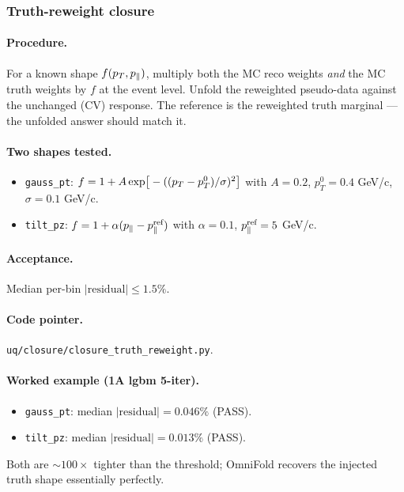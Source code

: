 \subsubsection{Truth-reweight closure}
\label{sec:closure-tr}

\paragraph{Procedure.}
For a known shape $f(p_{T},p_{\parallel})$, multiply both the MC reco weights
\emph{and} the MC truth weights by $f$ at the event level. Unfold the
reweighted pseudo-data against the unchanged (CV) response. The
reference is the reweighted truth marginal --- the unfolded answer
should match it.

\paragraph{Two shapes tested.}
\begin{itemize}[nosep]
  \item \texttt{gauss\_pt}: $f = 1 + A\exp\!\big[-((p_{T} - p_{T}^{0})/\sigma)^{2}\big]$
        with $A=0.2$, $p_{T}^{0}=0.4$ GeV/c, $\sigma=0.1$ GeV/c.
  \item \texttt{tilt\_pz}: $f = 1 + \alpha(p_{\parallel} - p_{\parallel}^{\text{ref}})$
        with $\alpha=0.1$, $p_{\parallel}^{\text{ref}}=5$ GeV/c.
\end{itemize}

\paragraph{Acceptance.}
Median per-bin $|\text{residual}|\le 1.5\%$.

\paragraph{Code pointer.}
\texttt{uq/closure/closure\_truth\_reweight.py}.

\paragraph{Worked example (1A lgbm 5-iter).}
\begin{itemize}[nosep]
  \item \texttt{gauss\_pt}: median $|\text{residual}|=\boxed{0.046\%}$ (PASS).
  \item \texttt{tilt\_pz}: median $|\text{residual}|=\boxed{0.013\%}$ (PASS).
\end{itemize}
Both are $\sim 100\times$ tighter than the threshold; OmniFold
recovers the injected truth shape essentially perfectly.

